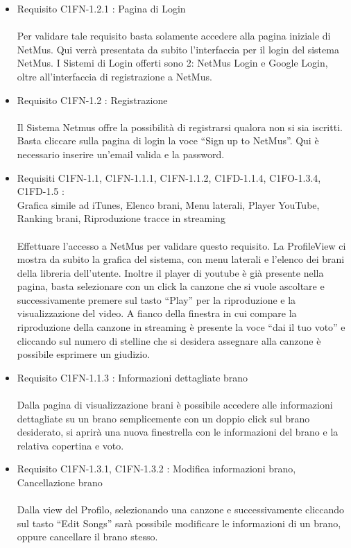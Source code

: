 \begin{itemize}
  \item Requisito C1FN-1.2.1 : Pagina di Login\\
  \\Per validare tale requisito basta solamente accedere alla pagina
  iniziale di NetMus. Qui verr\`a presentata da subito l'interfaccia per il
  login del sistema NetMus. I Sistemi di Login offerti sono 2: NetMus Login e
  Google Login, oltre all'interfaccia di registrazione a NetMus.
  
  \item Requisito C1FN-1.2 : Registrazione\\
  \\Il Sistema Netmus offre la possibilit\`a di registrarsi qualora non si sia
  iscritti. Basta cliccare sulla pagina di login la voce ``Sign up to
  NetMus''. Qui \`e necessario inserire un'email valida e la password.
  
  \item Requisiti C1FN-1.1, C1FN-1.1.1, C1FN-1.1.2, C1FD-1.1.4, C1FO-1.3.4,
  C1FD-1.5 :\\
  Grafica simile ad iTunes, Elenco brani, Menu laterali, Player
  YouTube, Ranking brani, Riproduzione tracce in streaming\\
  \\Effettuare  l'accesso a NetMus per validare questo requisito. La ProfileView
  ci mostra da subito la grafica del sistema, con menu laterali e l'elenco dei brani della libreria dell'utente. Inoltre il player di youtube
  \`e gi\`a presente nella pagina, basta selezionare con un click la canzone che
  si vuole ascoltare e successivamente premere sul tasto ``Play'' per la
  riproduzione e la visualizzazione del video. A fianco della finestra in cui
  compare la riproduzione della canzone in streaming \`e presente la voce ``dai
  il tuo voto'' e cliccando sul numero di stelline che si desidera
  assegnare alla canzone  \`e possibile esprimere un giudizio.
  
  \item Requisito C1FN-1.1.3 : Informazioni dettagliate brano\\
  \\Dalla pagina di visualizzazione brani \`e possibile accedere alle
  informazioni dettagliate su un brano semplicemente con un doppio click sul brano
  desiderato, si aprir\`a una nuova finestrella con le informazioni del brano e
  la relativa copertina e voto.
  
  \item Requisito C1FN-1.3.1, C1FN-1.3.2 : Modifica informazioni brano,
  Cancellazione brano\\
  \\Dalla view del Profilo, selezionando una canzone e successivamente cliccando
  sul tasto ``Edit Songs'' sar\`a possibile modificare le informazioni di un
  brano, oppure cancellare il brano stesso.
  

\end{itemize}
